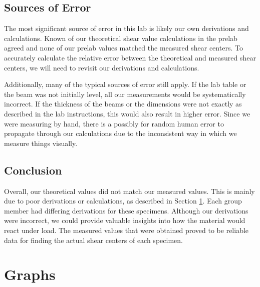\documentclass[12 pt]{report}
\begin{document}
\section{Sources of Error}\label{sources_of_error}
The most significant source of error in this lab is likely our own derivations and calculations. Known of our theoretical shear value calculations in the prelab agreed and none of our prelab values matched the measured shear centers. To accurately calculate the relative error between the theoretical and measured shear centers, we will need to revisit our derivations and calculations.

Additionally, many of the typical sources of error still apply. If the lab table or the beam was not initially level, all our measurements would be systematically incorrect. If the thickness of the beams or the dimensions were not exactly as described in the lab instructions, this would also result in higher error. Since we were measuring by hand, there is a possibly for random human error to propagate through our calculations due to the inconsistent way in which we measure things visually.

\section{Conclusion} \label{conclusion-section}

Overall, our theoretical values did not match our measured values. This is mainly due to poor derivations or calculations, as described in Section \ref{sources_of_error}. Each group member had differing derivations for these specimens. Although our derivations were incorrect, we could provide valuable insights into how the material would react under load. The measured values that were obtained proved to be reliable data for finding the actual shear centers of each specimen.

\printbibliography[heading=subbibintoc]
\appendix
\chapter{Graphs}
\end{document}
